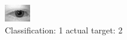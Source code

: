 \begin{figure}[h!]
\begin{center}
\includegraphics[width=0.60\columnwidth]{figures/ID382_class_1_target_2.png}
\end{center}
\caption{ Classification: 1 actual target: 2}
\label{fig:ID382_class_1_target_2}
\end{figure}
